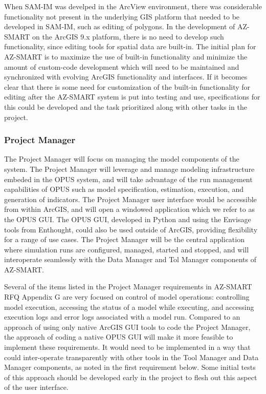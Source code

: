 When SAM-IM was develped in the ArcView environment, there was considerable functionality not present in the underlying GIS platform that needed to be developed in SAM-IM, such as editing of polygons.  In the development of AZ-SMART on the ArcGIS 9.x platform, there is no need to develop such functionality, since editing tools for spatial data are built-in.  The initial plan for AZ-SMART is to maximize the use of built-in functionality and minimize the amount of custom-code development which will need to be maintained and synchronized with evolving ArcGIS functionality and interfaces.  If it becomes clear that there is some need for customization of the built-in functionality for editing after the AZ-SMART system is put into testing and use, specifications for this could be developed and the task prioritized along with other tasks in the project.


\subsubsection{Project Manager}

The Project Manager will focus on managing the model components of the system. The Project Manager will leverage and manage modeling infrastructure embeded in the OPUS system, and will take advantage of the run management capabilities of OPUS such as model specification, estimation, execution, and generation of indicators.  The Project Manager user interface would be accessible from within ArcGIS, and will open a windowed application which we refer to as the OPUS GUI.  The OPUS GUI, developed in Python and using the Envisage tools from Enthought, could also be used outside of ArcGIS, providing flexibility for a range of use cases.  The Project Manager will be the central application where simulation runs are configured, managed, started and stopped, and will interoperate seamlessly with the Data Manager and Tol Manager components of AZ-SMART.

Several of the items listed in the Project Manager requirements in AZ-SMART RFQ Appendix G are very focused on control of model operations: controlling model execution, accessing the status of a model while executing, and accessing execution logs and error logs associated with a model run.  Compared to an approach of using only native ArcGIS GUI tools to code the Project Manager, the approach of coding a native OPUS GUI will make it more feasible to implement these requirements.  It would need to be implemented in a way that could inter-operate transparently with other tools in the Tool Manager and Data Manager components, as noted in the first requirement below. Some initial tests of this approach should be developed early in the project to flesh out this aspect of the user interface.

